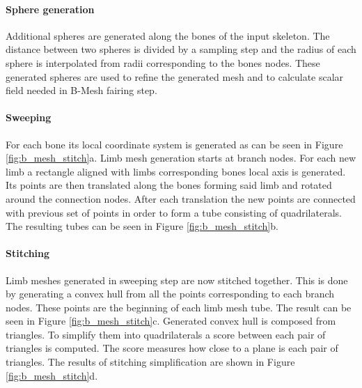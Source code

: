 \paragraph{Sphere generation}
Additional spheres are generated along the bones of the input skeleton.
The distance between two spheres is divided by a sampling step and the radius of each sphere is interpolated from radii corresponding to the bones nodes.
These generated spheres are used to refine the generated mesh and to calculate scalar field needed in B-Mesh fairing step.

\paragraph{Sweeping}
For each bone its local coordinate system is generated as can be seen in Figure \ref{fig:b_mesh_stitch}a. Limb mesh generation starts at branch nodes. For each new limb a rectangle aligned with limbs corresponding bones local axis is generated. Its points are then translated along the bones forming said limb and rotated around the connection nodes. After each translation the new points are connected with previous set of points in order to form a tube consisting of quadrilaterals. The resulting tubes can be seen in Figure \ref{fig:b_mesh_stitch}b.

\paragraph{Stitching}
Limb meshes generated in sweeping step are now stitched together. This is done by generating a convex hull from all the points corresponding to each branch nodes. These points are the beginning of each limb mesh tube. The result can be seen in Figure \ref{fig:b_mesh_stitch}c. Generated convex hull is composed from triangles. To simplify them into quadrilaterals a score between each pair of triangles is computed. The score measures how close to a plane is each pair of triangles. The results of stitching simplification are shown in Figure \ref{fig:b_mesh_stitch}d.


